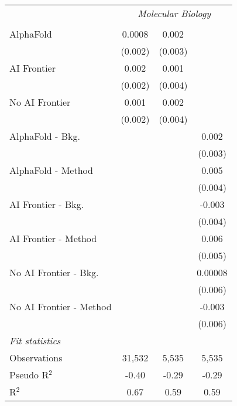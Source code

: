 \begin{tabular}{lccc}
 & \multicolumn{3}{c}{\textit{Molecular Biology}} \\ \\
   AlphaFold               & 0.0008  & 0.002   &   \\   
                           & (0.002) & (0.003) &   \\   
   AI Frontier             & 0.002   & 0.001   &   \\   
                           & (0.002) & (0.004) &   \\   
   No AI Frontier          & 0.001   & 0.002   &   \\   
                           & (0.002) & (0.004) &   \\   
   AlphaFold - Bkg.        &         &         & 0.002\\   
                           &         &         & (0.003)\\   
   AlphaFold - Method      &         &         & 0.005\\   
                           &         &         & (0.004)\\   
   AI Frontier - Bkg.      &         &         & -0.003\\   
                           &         &         & (0.004)\\   
   AI Frontier - Method    &         &         & 0.006\\   
                           &         &         & (0.005)\\   
   No AI Frontier - Bkg.   &         &         & 0.00008\\   
                           &         &         & (0.006)\\   
   No AI Frontier - Method &         &         & -0.003\\   
                           &         &         & (0.006)\\   
   \midrule
   \emph{Fit statistics}\\
   Observations            & 31,532  & 5,535   & 5,535\\  
   Pseudo R$^2$            & -0.40   & -0.29   & -0.29\\  
   R$^2$                   & 0.67    & 0.59    & 0.59\\  
   

\end{tabular}
